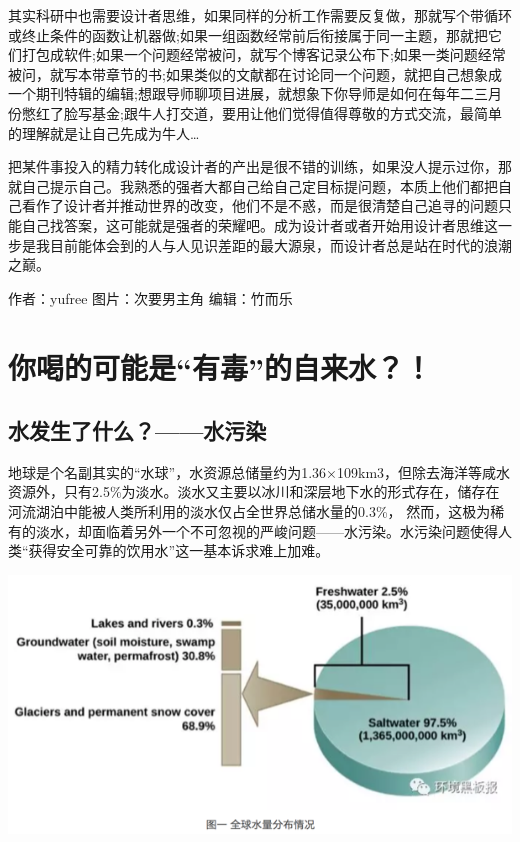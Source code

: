 \documentclass[]{book}
\begin{document}
其实科研中也需要设计者思维，如果同样的分析工作需要反复做，那就写个带循环或终止条件的函数让机器做;如果一组函数经常前后衔接属于同一主题，那就把它们打包成软件;如果一个问题经常被问，就写个博客记录公布下;如果一类问题经常被问，就写本带章节的书;如果类似的文献都在讨论同一个问题，就把自己想象成一个期刊特辑的编辑;想跟导师聊项目进展，就想象下你导师是如何在每年二三月份憋红了脸写基金;跟牛人打交道，要用让他们觉得值得尊敬的方式交流，最简单的理解就是让自己先成为牛人\ldots{}

把某件事投入的精力转化成设计者的产出是很不错的训练，如果没人提示过你，那就自己提示自己。我熟悉的强者大都自己给自己定目标提问题，本质上他们都把自己看作了设计者并推动世界的改变，他们不是不惑，而是很清楚自己追寻的问题只能自己找答案，这可能就是强者的荣耀吧。成为设计者或者开始用设计者思维这一步是我目前能体会到的人与人见识差距的最大源泉，而设计者总是站在时代的浪潮之巅。

作者：yufree 图片：次要男主角 编辑：竹而乐

\section{\texorpdfstring{你喝的可能是``有毒''的自来水？！}{你喝的可能是有毒的自来水？！}}

\subsection{水发生了什么？------水污染}

地球是个名副其实的``水球''，水资源总储量约为1.36×109km3，但除去海洋等咸水资源外，只有2.5\%为淡水。淡水又主要以冰川和深层地下水的形式存在，储存在河流湖泊中能被人类所利用的淡水仅占全世界总储水量的0.3\%，
然而，这极为稀有的淡水，却面临着另外一个不可忽视的严峻问题------水污染。水污染问题使得人类``获得安全可靠的饮用水''这一基本诉求难上加难。

\includegraphics[width=8.33in]{images/dushui1}
\end{document}
